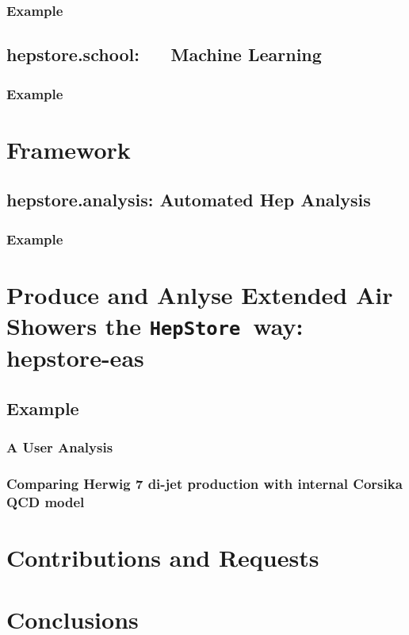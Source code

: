 \documentclass[aps,prd,11pt,tightenlines,superscriptaddress,nofootinbib,preprintnumbers,notitlepage]{revtex4-1}
\newcommand{\hepstore}{\texttt{HepStore}}
\begin{document}
\subsubsection{Example}


\subsection{hepstore.school:~~~\,Machine Learning}


\subsubsection{Example}

\section{Framework}

\subsection{hepstore.analysis: Automated Hep Analysis}

\subsubsection{Example}

\section{Produce and Anlyse Extended Air Showers the \hepstore~way: hepstore-eas}

\subsection{Example}

\subsubsection{A User Analysis}

\subsubsection{Comparing Herwig 7 di-jet production with internal Corsika QCD model}

\section{Contributions and Requests}

\section{Conclusions}

\begin{appendix}


\end{appendix}
\end{document}
